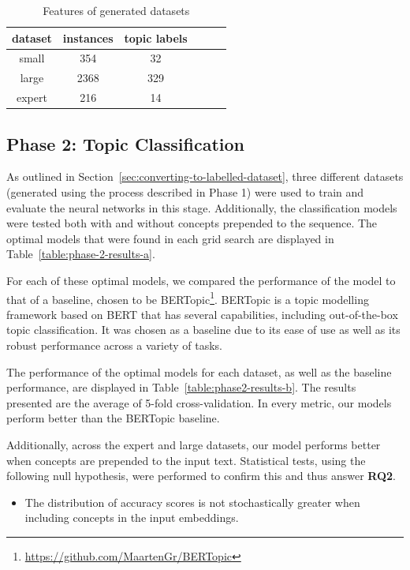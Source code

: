 \documentclass[twocolumn]{article}
\newcommand{\nullhypothesis}[1]{
\vspace{-0.5em}
\begin{itemize}[label=$H_0$:]
\item #1
\end{itemize}
}
\begin{document}
\begin{table}[h!]
\centering
\caption{Features of generated datasets}
\label{table:generated-dataset-features}
\begin{tabular}{cccccc}
\toprule
dataset & instances & topic labels \\
\midrule
small & 354 & 32  \\
large & 2368 & 329  \\
expert & 216 & 14  \\
\bottomrule
\end{tabular}
\end{table}

\subsection{Phase 2: Topic Classification}

As outlined in Section~\ref{sec:converting-to-labelled-dataset}, three different datasets (generated using the process described in Phase 1) were used to train and evaluate the neural networks in this stage. Additionally, the classification models were tested both with and without concepts prepended to the sequence. The optimal models that were found in each grid search are displayed in Table~\ref{table:phase-2-results-a}.




For each of these optimal models, we compared the performance of the model to that of a baseline, chosen to be BERTopic\footnote{\url{https://github.com/MaartenGr/BERTopic}}\cite{grootendorst2022}. BERTopic is a topic modelling framework based on BERT that has several capabilities, including out-of-the-box topic classification. It was chosen as a baseline due to its ease of use as well as its robust performance across a variety of tasks.

The performance of the optimal models for each dataset, as well as the baseline performance, are displayed in Table~\ref{table:phase2-results-b}. The results presented are the average of 5-fold cross-validation. In every metric, our models perform better than the BERTopic baseline.

Additionally, across the expert and large datasets, our model performs better when concepts are prepended to the input text. Statistical tests, using the following null hypothesis, were performed to confirm this and thus answer \textbf{RQ2}.

\nullhypothesis{
    The distribution of accuracy scores is not stochastically greater when including concepts in the input embeddings.
}
\end{document}
